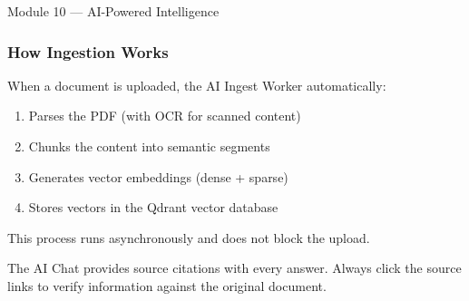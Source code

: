 \begin{ugModule}{Module 10 --- AI-Powered Intelligence}
  \subsubsection*{How Ingestion Works}
  When a document is uploaded, the AI Ingest Worker automatically:
  \begin{enumerate}[leftmargin=18pt]
    \item Parses the PDF (with OCR for scanned content)
    \item Chunks the content into semantic segments
    \item Generates vector embeddings (dense + sparse)
    \item Stores vectors in the Qdrant vector database
  \end{enumerate}
  This process runs asynchronously and does not block the upload.

  \begin{ugTip}
    The AI Chat provides source citations with every answer.
    Always click the source links to verify information
    against the original document.
  \end{ugTip}
\end{ugModule}

\vspace{10pt}

